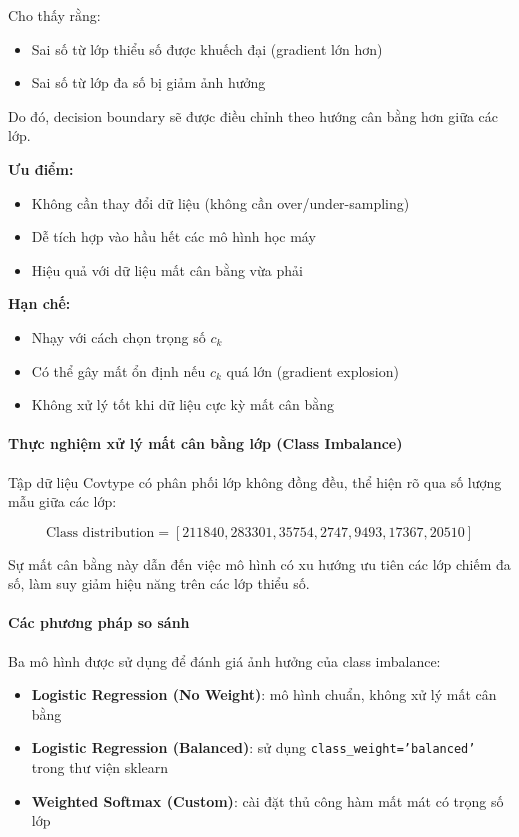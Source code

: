 Cho thấy rằng:
\begin{itemize}
    \item Sai số từ lớp thiểu số được khuếch đại (gradient lớn hơn)
    \item Sai số từ lớp đa số bị giảm ảnh hưởng
\end{itemize}

Do đó, decision boundary sẽ được điều chỉnh theo hướng cân bằng hơn giữa các lớp.

\textbf{Ưu điểm:}
\begin{itemize}
    \item Không cần thay đổi dữ liệu (không cần over/under-sampling)
    \item Dễ tích hợp vào hầu hết các mô hình học máy
    \item Hiệu quả với dữ liệu mất cân bằng vừa phải
\end{itemize}

\textbf{Hạn chế:}
\begin{itemize}
    \item Nhạy với cách chọn trọng số $c_k$
    \item Có thể gây mất ổn định nếu $c_k$ quá lớn (gradient explosion)
    \item Không xử lý tốt khi dữ liệu cực kỳ mất cân bằng
\end{itemize}

\paragraph{Thực nghiệm xử lý mất cân bằng lớp (Class Imbalance)}

Tập dữ liệu Covtype có phân phối lớp không đồng đều, thể hiện rõ qua số lượng mẫu giữa các lớp:

\[
\text{Class distribution} = [211840, 283301, 35754, 2747, 9493, 17367, 20510]
\]

Sự mất cân bằng này dẫn đến việc mô hình có xu hướng ưu tiên các lớp chiếm đa số, làm suy giảm hiệu năng trên các lớp thiểu số.

\paragraph{Các phương pháp so sánh}

Ba mô hình được sử dụng để đánh giá ảnh hưởng của class imbalance:

\begin{itemize}
    \item \textbf{Logistic Regression (No Weight)}: mô hình chuẩn, không xử lý mất cân bằng
    \item \textbf{Logistic Regression (Balanced)}: sử dụng \texttt{class\_weight='balanced'} trong thư viện sklearn
    \item \textbf{Weighted Softmax (Custom)}: cài đặt thủ công hàm mất mát có trọng số lớp
\end{itemize}

